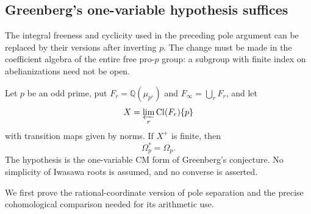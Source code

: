 \subsection{Greenberg's one-variable hypothesis suffices}
\label{sec:greenberg-kernel}

The integral freeness and cyclicity used in the preceding pole argument
can be replaced by their versions after inverting $p$. The change must
be made in the coefficient algebra of the entire free pro-$p$ group:
a subgroup with finite index on abelianizations need not be open.

\begin{theorem}\label{thm:greenberg-kernel}
Let $p$ be an odd prime, put $F_r=\mathbb Q(\mu_{p^r})$ and
$F_\infty=\bigcup_r F_r$, and let
\[
 X=\varprojlim_r\operatorname{Cl}(F_r)\{p\}
\]
with transition maps given by norms. If $X^+$ is finite, then
\[
 \Omega_p^*=\Omega_p.
\]
The hypothesis is the one-variable CM form of Greenberg's conjecture.
No simplicity of Iwasawa roots is assumed, and no converse is asserted.
\end{theorem}

We first prove the rational-coordinate version of pole separation and
the precise cohomological comparison needed for its arithmetic use.

